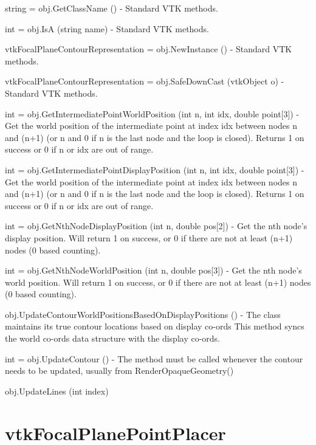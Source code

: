 \begin{DoxyItemize}
\item {\ttfamily string = obj.\-Get\-Class\-Name ()} -\/ Standard V\-T\-K methods.  
\item {\ttfamily int = obj.\-Is\-A (string name)} -\/ Standard V\-T\-K methods.  
\item {\ttfamily vtk\-Focal\-Plane\-Contour\-Representation = obj.\-New\-Instance ()} -\/ Standard V\-T\-K methods.  
\item {\ttfamily vtk\-Focal\-Plane\-Contour\-Representation = obj.\-Safe\-Down\-Cast (vtk\-Object o)} -\/ Standard V\-T\-K methods.  
\item {\ttfamily int = obj.\-Get\-Intermediate\-Point\-World\-Position (int n, int idx, double point\mbox{[}3\mbox{]})} -\/ Get the world position of the intermediate point at index idx between nodes n and (n+1) (or n and 0 if n is the last node and the loop is closed). Returns 1 on success or 0 if n or idx are out of range.  
\item {\ttfamily int = obj.\-Get\-Intermediate\-Point\-Display\-Position (int n, int idx, double point\mbox{[}3\mbox{]})} -\/ Get the world position of the intermediate point at index idx between nodes n and (n+1) (or n and 0 if n is the last node and the loop is closed). Returns 1 on success or 0 if n or idx are out of range.  
\item {\ttfamily int = obj.\-Get\-Nth\-Node\-Display\-Position (int n, double pos\mbox{[}2\mbox{]})} -\/ Get the nth node's display position. Will return 1 on success, or 0 if there are not at least (n+1) nodes (0 based counting).  
\item {\ttfamily int = obj.\-Get\-Nth\-Node\-World\-Position (int n, double pos\mbox{[}3\mbox{]})} -\/ Get the nth node's world position. Will return 1 on success, or 0 if there are not at least (n+1) nodes (0 based counting).  
\item {\ttfamily obj.\-Update\-Contour\-World\-Positions\-Based\-On\-Display\-Positions ()} -\/ The class maintains its true contour locations based on display co-\/ords This method syncs the world co-\/ords data structure with the display co-\/ords.  
\item {\ttfamily int = obj.\-Update\-Contour ()} -\/ The method must be called whenever the contour needs to be updated, usually from Render\-Opaque\-Geometry()  
\item {\ttfamily obj.\-Update\-Lines (int index)}  
\end{DoxyItemize}\hypertarget{vtkwidgets_vtkfocalplanepointplacer}{}\section{vtk\-Focal\-Plane\-Point\-Placer}\label{vtkwidgets_vtkfocalplanepointplacer}
